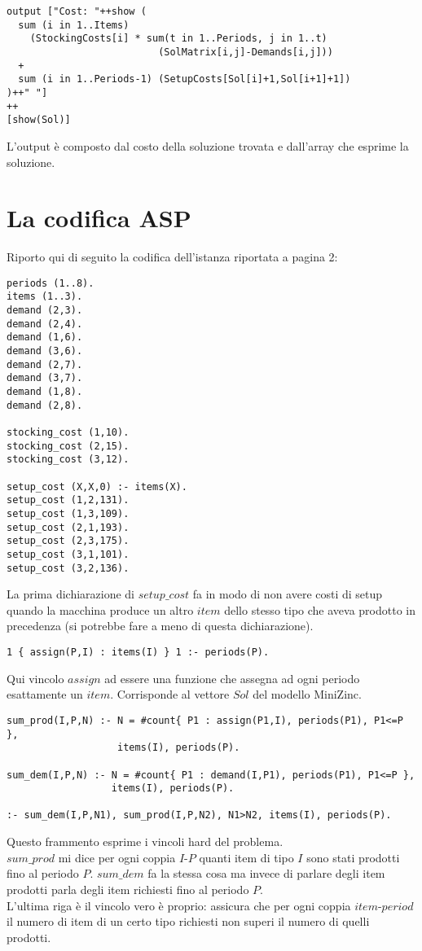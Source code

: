 \documentclass[12pt]{article}
\begin{document}
\begin{verbatim}
output ["Cost: "++show (
  sum (i in 1..Items)
    (StockingCosts[i] * sum(t in 1..Periods, j in 1..t)
                          (SolMatrix[i,j]-Demands[i,j]))
  +
  sum (i in 1..Periods-1) (SetupCosts[Sol[i]+1,Sol[i+1]+1])
)++" "]
++
[show(Sol)]
\end{verbatim}
L'output è composto dal costo della soluzione trovata e dall'array che esprime la soluzione.
\pagebreak

\section*{La codifica ASP}
Riporto qui di seguito la codifica dell'istanza riportata a pagina 2:
\begin{verbatim}
periods (1..8).
items (1..3).
demand (2,3).
demand (2,4).
demand (1,6).
demand (3,6).
demand (2,7).
demand (3,7).
demand (1,8).
demand (2,8).

stocking_cost (1,10).
stocking_cost (2,15).
stocking_cost (3,12).

setup_cost (X,X,0) :- items(X).
setup_cost (1,2,131).
setup_cost (1,3,109).
setup_cost (2,1,193).
setup_cost (2,3,175).
setup_cost (3,1,101).
setup_cost (3,2,136).
\end{verbatim}
La prima dichiarazione di $setup\_cost$ fa in modo di non avere costi di setup quando la macchina produce un altro $item$ dello stesso tipo che aveva prodotto in precedenza (si potrebbe fare a meno di questa dichiarazione).

\begin{verbatim}
1 { assign(P,I) : items(I) } 1 :- periods(P).
\end{verbatim}
Qui vincolo $assign$ ad essere una funzione che assegna ad ogni periodo esattamente un $item$. Corrisponde al vettore $Sol$ del modello MiniZinc.
\pagebreak

\begin{verbatim}
sum_prod(I,P,N) :- N = #count{ P1 : assign(P1,I), periods(P1), P1<=P },
                   items(I), periods(P).

sum_dem(I,P,N) :- N = #count{ P1 : demand(I,P1), periods(P1), P1<=P },
                  items(I), periods(P).

:- sum_dem(I,P,N1), sum_prod(I,P,N2), N1>N2, items(I), periods(P).
\end{verbatim}
Questo frammento esprime i vincoli hard del problema.\\
$sum\_prod$ mi dice per ogni coppia $I$-$P$ quanti item di tipo $I$ sono stati prodotti fino al periodo $P$. $sum\_dem$ fa la stessa cosa ma invece di parlare degli item prodotti parla degli item richiesti fino al periodo $P$.\\
L'ultima riga è il vincolo vero è proprio: assicura che per ogni coppia $item$-$period$ il numero di item di un certo tipo richiesti non superi il numero di quelli prodotti.
\end{document}
